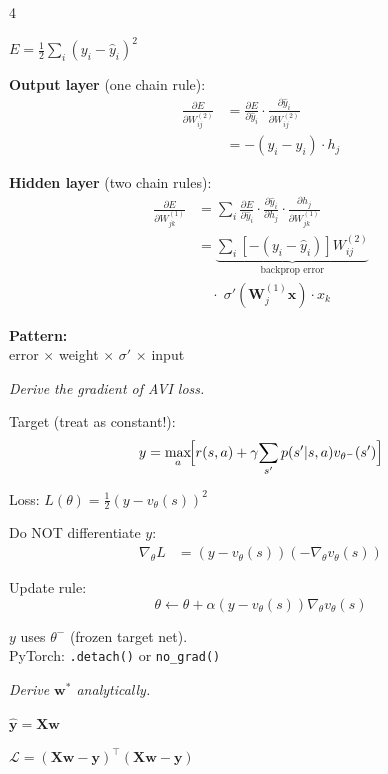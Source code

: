 \documentclass[6pt]{article}
\newcommand{\mathbox}[2]{%
\begin{tcolorbox}[colback=sandstorm, colframe=garnet, title={\scriptsize\bfseries\color{white}#1}, coltitle=white, colbacktitle=garnet, toptitle=1pt, bottomtitle=1pt]
#2
\end{tcolorbox}
}
\begin{document}
\begin{multicols}{4}
{$E = \frac{1}{2}\sum_i(y_i - \hat{y}_i)^2$

\textbf{Output layer} (one chain rule):
\begin{align*}
\frac{\partial E}{\partial W_{ij}^{(2)}} &= \frac{\partial E}{\partial\hat{y}_i}\cdot\frac{\partial\hat{y}_i}{\partial W_{ij}^{(2)}}\\
&= -(y_i - \hat{y}_i)\cdot h_j
\end{align*}

\textbf{Hidden layer} (two chain rules):
\begin{align*}
\frac{\partial E}{\partial W_{jk}^{(1)}} &= \sum_i\frac{\partial E}{\partial\hat{y}_i}\cdot\frac{\partial\hat{y}_i}{\partial h_j}\cdot\frac{\partial h_j}{\partial W_{jk}^{(1)}}\\
&= \underbrace{\sum_i[-(y_i\!-\!\hat{y}_i)]W_{ij}^{(2)}}_{\text{backprop error}}\\
&\quad\cdot\;\sigma'(\mathbf{W}^{(1)}_j\mathbf{x})\cdot x_k
\end{align*}

\textbf{Pattern:}\\
error $\times$ weight $\times$ $\sigma'$ $\times$ input
}

\vspace{3pt}

\mathbox{6. DAVI Gradient}{
\textit{Derive the gradient of AVI loss.}

Target {\color{rose}(treat as constant!)}:
\[
y = \max_a\!\Bigl[r(s,a) + \gamma\!\sum_{s'}p(s'|s,a)v_{\theta^-}(s')\Bigr]
\]

Loss: $L(\theta) = \frac{1}{2}(y - v_\theta(s))^2$

Do NOT differentiate $y$:
\begin{align*}
\nabla_\theta L &= (y\!-\!v_\theta(s))(-\nabla_\theta v_\theta(s))
\end{align*}

Update rule:
\[\boxed{\theta \leftarrow \theta + \alpha(y\!-\!v_\theta(s))\nabla_\theta v_\theta(s)}\]

$y$ uses $\theta^-$ (frozen target net).\\
PyTorch: \texttt{.detach()} or \texttt{no\_grad()}
}

\vfill\null
\columnbreak

\mathbox{7. Linear Regression Closed Form}{
\textit{Derive $\mathbf{w}^*$ analytically.}

$\hat{\mathbf{y}} = \mathbf{X}\mathbf{w}$

$\mathcal{L} = (\mathbf{X}\mathbf{w}\!-\!\mathbf{y})^\top(\mathbf{X}\mathbf{w}\!-\!\mathbf{y})$

}
\end{multicols}
\end{document}
